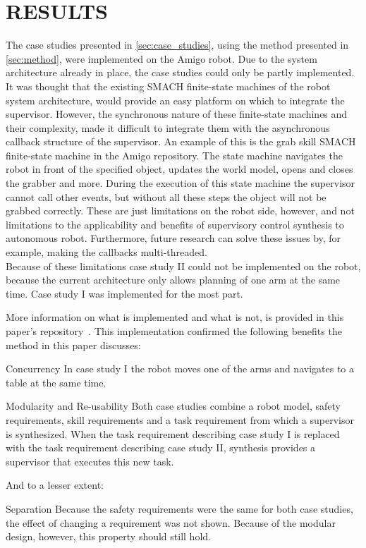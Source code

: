 \section{RESULTS}\label{sec:results}
The case studies presented in \cref{sec:case_studies}, using the method presented in \cref{sec:method}, were implemented on the Amigo robot.
Due to the system architecture already in place, the case studies could only be partly implemented.
It was thought that the existing SMACH finite-state machines of the robot system architecture, would provide an easy platform on which to integrate the supervisor.
However, the synchronous nature of these finite-state machines and their complexity, made it difficult to integrate them with the asynchronous callback structure of the supervisor.
An example of this is the grab skill SMACH finite-state machine in the Amigo repository.
The state machine navigates the robot in front of the specified object, updates the world model, opens and closes the grabber and more.
During the execution of this state machine the supervisor cannot call other events, but without all these steps the object will not be grabbed correctly.
These are just limitations on the robot side, however, and not limitations to the applicability and benefits of supervisory control synthesis to autonomous robot.
Furthermore, future research can solve these issues by, for example, making the callbacks multi-threaded.\\

Because of these limitations case study II could not be implemented on the robot, because the current architecture only allows planning of one arm at the same time.
Case study I was implemented for the most part.

More information on what is implemented and what is not, is provided in this paper's repository~\cite{jorrit_github}.
This implementation confirmed the following benefits the method in this paper discusses:\\

\begin{LaTeXdescription}
	\item [Concurrency] In case study I the robot moves one of the arms and navigates to a table at the same time.
	\item [Modularity and Re-usability] Both case studies combine a robot model, safety requirements, skill requirements and a task requirement from which a supervisor is synthesized. When the task requirement describing case study I is replaced with the task requirement describing case study II, synthesis provides a supervisor that executes this new task.\\
\end{LaTeXdescription}

And to a lesser extent:
\begin{LaTeXdescription}
	\item [Separation] Because the safety requirements were the same for both case studies, the effect of changing a requirement was not shown. Because of the modular design, however, this property should still hold.\\
\end{LaTeXdescription}



